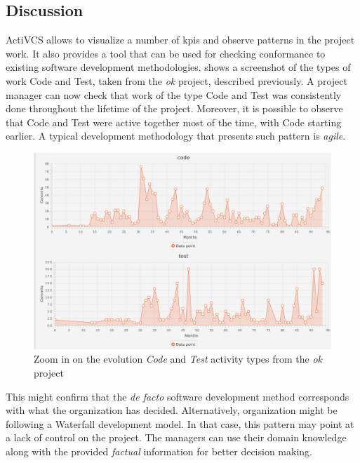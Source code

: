\subsection{Discussion}
\label{sec:discussion}

ActiVCS allows to visualize a number of \glspl{kpi} and observe patterns in the project work. It also provides a tool that can be used for checking conformance to existing software development methodologies. 
 shows a screenshot of the types of work Code and Test, taken from the \textsl{ok} project, described previously. A project manager can now check that work of the type Code and Test was consistently done throughout the lifetime of the project. Moreover, it is possible to observe that Code and Test were active together most of the time, with Code starting earlier. A typical development methodology that presents such pattern is \emph{agile}. 
\begin{figure}[]
    \centering
    \includegraphics[width=\textwidth]{Project-mining-2-Mining-Type-of-Work/figures/ok-code-test}
    \caption{Zoom in on the evolution \textsl{Code} and \textsl{Test} activity types from the \textsl{ok} project}
    \label{fig:zoom}
\end{figure}


This might confirm that the \textsl{de facto} software development method corresponds with what the organization has decided. Alternatively, organization might be following a Waterfall development model. In that case, this pattern may point at a lack of control on the project. The managers can use their domain knowledge along with the provided \emph{factual} information for better decision making.



